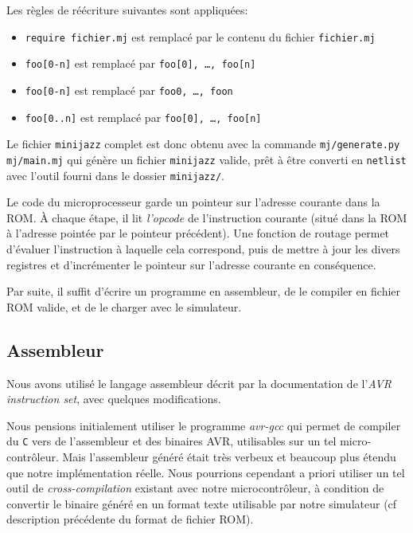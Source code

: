 \documentclass[11pt]{article}
\begin{document}
\pagebreak
Les règles de réécriture suivantes sont appliquées:
\begin{itemize}
    \item \texttt{require fichier.mj} est remplacé par le contenu du fichier \texttt{fichier.mj}
    \item \texttt{foo[0-n]} est remplacé par \texttt{foo[0], \dots, foo[n]}
    \item \texttt{foo[0-n]} est remplacé par \texttt{foo0, \dots, foon}
    \item \texttt{foo[0..n]} est remplacé par \texttt{foo[0], \dots, foo[n]}
\end{itemize}

Le fichier \texttt{minijazz} complet est donc obtenu avec la commande \texttt{mj/generate.py mj/main.mj} qui génère un fichier \texttt{minijazz} valide, prêt à être converti en \texttt{netlist} avec l'outil fourni dans le dossier \texttt{minijazz/}.

Le code du microprocesseur garde un pointeur sur l'adresse courante dans la ROM. À chaque étape, il lit \emph{l'opcode} de l'instruction courante (situé dans la ROM à l'adresse pointée par le pointeur précédent). Une fonction de routage permet d'évaluer l'instruction à laquelle cela correspond, puis de mettre à jour les divers registres et d'incrémenter le pointeur sur l'adresse courante en conséquence.

Par suite, il suffit d'écrire un programme en assembleur, de le compiler en fichier ROM valide, et de le charger avec le simulateur.

\subsection{Assembleur}

Nous avons utilisé le langage assembleur décrit par la documentation de l'\emph{AVR instruction set}, avec quelques modifications.

Nous pensions initialement utiliser le programme \emph{avr-gcc} qui permet de compiler du \texttt{C} vers de l'assembleur et des binaires AVR, utilisables sur un tel micro-contrôleur. Mais l'assembleur généré était très verbeux et beaucoup plus étendu que notre implémentation réelle. Nous pourrions cependant a priori utiliser un tel outil de \emph{cross-compilation} existant avec notre microcontrôleur, à condition de convertir le binaire généré en un format texte utilisable par notre simulateur (cf description précédente du format de fichier ROM).
\end{document}
